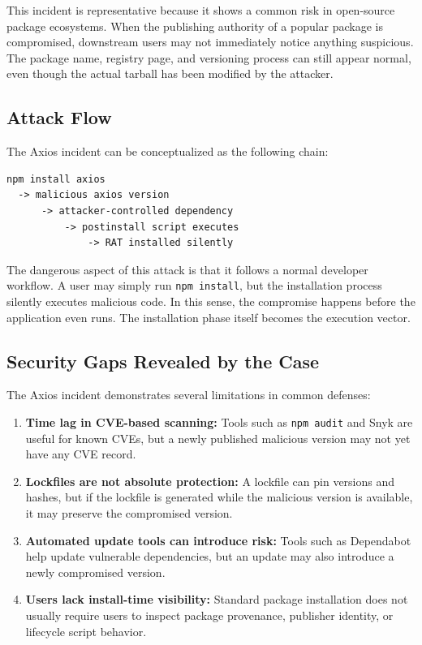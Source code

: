 \documentclass[12pt,a4paper]{article}
\begin{document}
This incident is representative because it shows a common risk in open-source package ecosystems. When the publishing authority of a popular package is compromised, downstream users may not immediately notice anything suspicious. The package name, registry page, and versioning process can still appear normal, even though the actual tarball has been modified by the attacker.

\subsection{Attack Flow}

The Axios incident can be conceptualized as the following chain:

\begin{lstlisting}[style=commandstyle]
npm install axios
  -> malicious axios version
      -> attacker-controlled dependency
          -> postinstall script executes
              -> RAT installed silently
\end{lstlisting}

The dangerous aspect of this attack is that it follows a normal developer workflow. A user may simply run \texttt{npm install}, but the installation process silently executes malicious code. In this sense, the compromise happens before the application even runs. The installation phase itself becomes the execution vector.

\subsection{Security Gaps Revealed by the Case}

The Axios incident demonstrates several limitations in common defenses:

\begin{enumerate}[label=(\arabic*)]
  \item \textbf{Time lag in CVE-based scanning:} Tools such as \texttt{npm audit} and Snyk are useful for known CVEs, but a newly published malicious version may not yet have any CVE record.
  \item \textbf{Lockfiles are not absolute protection:} A lockfile can pin versions and hashes, but if the lockfile is generated while the malicious version is available, it may preserve the compromised version.
  \item \textbf{Automated update tools can introduce risk:} Tools such as Dependabot help update vulnerable dependencies, but an update may also introduce a newly compromised version.
  \item \textbf{Users lack install-time visibility:} Standard package installation does not usually require users to inspect package provenance, publisher identity, or lifecycle script behavior.
\end{enumerate}
\end{document}
